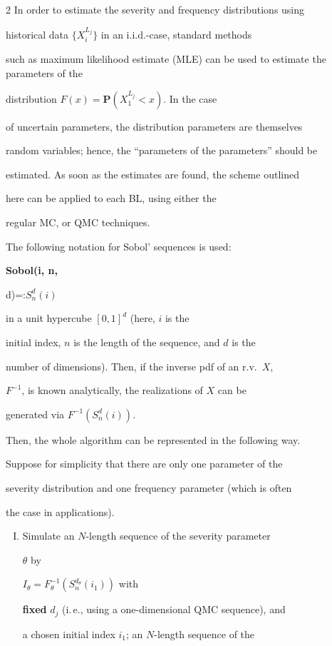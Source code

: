 \begin{multicols}{2}
In order to estimate the severity and frequency distributions using

historical data $\{X^{L_j}_i\}$ in an i.i.d.-case, standard methods

such as maximum likelihood estimate (MLE) can be used to estimate the parameters of the

distribution $F(x)=\mathbf{P}\left(X^{L_j}_1<x\right)$. In the case

of uncertain parameters, the distribution parameters are themselves

random variables; hence, the ``parameters of the parameters'' should be

estimated. As soon as the estimates are found, the scheme outlined

here can be applied to each BL, using either the

regular MC, or QMC techniques.



The following notation for Sobol' sequences is used: {\bf Sobol(i, n,

d)=:$S^d_n(i)$} in a unit hypercube $[0,1]^d$ (here, $i$ is the

initial index, $n$ is the length of the sequence, and $d$ is the

number of dimensions). Then, if the inverse pdf of an r.v.~$X$,

$F^{-1}$, is known analytically, the realizations of $X$ can be

generated via $F^{-1}\left(S^d_n(i)\right)$.



Then, the whole algorithm can be represented in the following way.

Suppose for simplicity that there are only one parameter of the

severity distribution and one frequency parameter (which is often

the case in applications).

\begin{enumerate}[I.]

\item Simulate an $N$-length sequence of the severity parameter

$\theta$ by

$I_\theta=F_{\theta}^{-1}\left(S^{d_{\theta}}_n(i_1)\right)$ with

{\bf fixed} $d_j$ (i.\,e., using a one-dimensional QMC sequence), and

a chosen initial index $i_1$; an $N$-length sequence of the


\end{enumerate}
\end{multicols}
